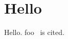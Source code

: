 \documentclass{article}
\begin{document}
\section{Hello}
Hello. foo~\cite{foobar} is cited.




\printindex
\end{document}
